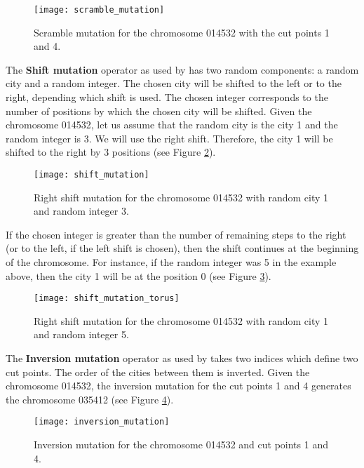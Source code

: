 \begin{figure}[htp] \centering
	\centering
	\texttt{[image: scramble\_mutation]}
	\caption{Scramble mutation for the chromosome 014532 with the cut points 1 and 4.}
	\label{scramble_mutation}
\end{figure}


The \textbf{Shift mutation} operator as used by \citeauthor{akay2013recent} \cite{akay2013recent} has two random components: a random city and a random integer. The chosen city will be shifted to the left or to the right, depending which shift is used. The chosen integer corresponds to the number of positions by which the chosen city will be shifted. Given the chromosome 014532, let us assume that the random city is the city 1 and the random integer is 3. We will use the right shift. Therefore, the city 1 will be shifted to the right by 3 positions (see Figure \ref{shift_mutation}).

\begin{figure}[htp] \centering
	\centering
	\texttt{[image: shift\_mutation]}
	\caption{Right shift mutation for the chromosome 014532 with random city 1 and random integer 3.}
	\label{shift_mutation}
\end{figure}

If the chosen integer is greater than the number of remaining steps to the right (or to the left, if the left shift is chosen), then the shift continues at the beginning of the chromosome. For instance, if the random integer was 5 in the example above, then the city 1 will be at the position 0 (see Figure \ref{shift_mutation_torus}).

\begin{figure}[htp] \centering
	\centering
	\texttt{[image: shift\_mutation\_torus]}
	\caption{Right shift mutation for the chromosome 014532 with random city 1 and random integer 5.}
	\label{shift_mutation_torus}
\end{figure}


The \textbf{Inversion mutation} operator as used by \citeauthor{akay2013recent} \cite{akay2013recent} takes two indices which define two cut points. The order of the cities between them is inverted. Given the chromosome 014532, the inversion mutation for the cut points 1 and 4 generates the chromosome 035412 (see Figure \ref{inversion_mutation}).

\begin{figure}[htp] \centering
	\centering
	\texttt{[image: inversion\_mutation]}
	\caption{Inversion mutation for the chromosome 014532 and cut points 1 and 4.}
	\label{inversion_mutation}
\end{figure}

